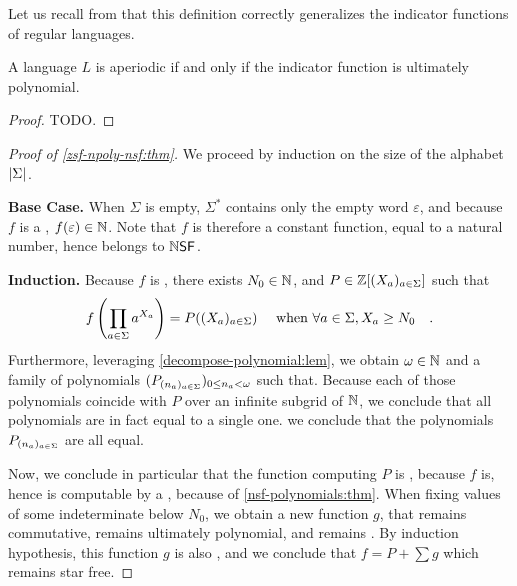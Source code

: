 Let us recall from \cite{LOPEZ23b} that this definition correctly
generalizes the indicator functions of regular languages.

\begin{example}
    A language $L$ is aperiodic if and only if 
    the indicator function is ultimately polynomial.
\end{example}
\begin{proof}
    TODO.
\end{proof}

\begin{proof}[Proof of \cref{zsf-npoly-nsf:thm}]
    We proceed by induction on the size of the alphabet $\card{\Sigma}$.

    \textbf{Base Case.} When $\Sigma$ is empty, $\Sigma^*$ contains
    only the empty word $\varepsilon$, and because $f$ is a
    , $f(\varepsilon) \in \mathbb{N}$.
    Note that $f$ is therefore a constant function, equal to a natural
    number, hence belongs to $\NSF$.

    
    \textbf{Induction.}
    Because $f$ is ,
    there exists $N_0 \in \mathbb{N}$, 
    and $P \in \mathbb{Z}[(X_a)_{a \in \Sigma}]$ 
    such that
    \begin{equation*}
        f\left( \prod_{a \in \Sigma} a^{X_a} \right)
        = 
        P((X_a)_{a \in \Sigma})
        \quad
        \text{ when }
        \forall a \in \Sigma, X_a \geq N_0
        \quad .
    \end{equation*}
    Furthermore, leveraging \cref{decompose-polynomial:lem},
    we obtain $\omega \in \mathbb{N}$
    and a family of polynomials 
    $(P_{(n_a)_{a \in \Sigma}})_{0 \leq n_a < \omega}$
    such that.
    Because each of those polynomials coincide with $P$ over an infinite
    subgrid of $\mathbb{N}$,
    we conclude that all polynomials are in fact equal to a single one.
    we conclude that the polynomials 
    $P_{(n_a)_{a \in \Sigma}}$ are all equal.

    Now, we conclude in particular that the function 
    computing $P$ is , because $f$ is,
    hence is computable by a ,
    because of \cref{nsf-polynomials:thm}.
    When fixing values of some indeterminate below $N_0$,
    we obtain a new function $g$, that remains commutative,
    remains ultimately polynomial, and remains .
    By induction hypothesis, this function $g$ is also 
    , and we conclude
    that 
    $f = P + \sum g$ which remains star free.
\end{proof}

